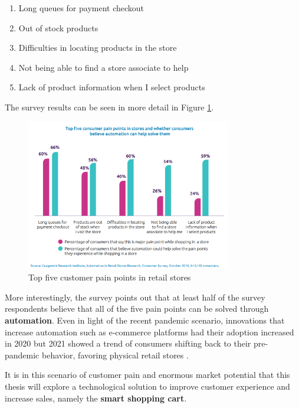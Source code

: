 \documentclass[openright]{normas-utf-tex} %
\begin{document}
\begin{enumerate}
        \item Long queues for payment checkout
        \item Out of stock products
        \item Difficulties in locating products in the store
        \item Not being able to find a store associate to help
        \item Lack of product information when I select products
\end{enumerate}

The survey results can be seen in more detail in Figure \ref{fig:capgemini}.

\begin{figure}[H]
	\centering
	\includegraphics[width=0.8\textwidth]{./images/painpoints.png}
    \caption[Top five customer pain points in retail stores]{Top five customer pain points in retail stores}
    \label{fig:capgemini}
\end{figure}

More interestingly, the survey points out that at least half of the survey
respondents believe that all of the five pain points can be solved through
\textbf{automation}. Even in light of the recent pandemic scenario, innovations
that increase automation such as e-commerce platforms had their adoption
increased in 2020 but 2021 showed a trend of consumers shifting
back to their pre-pandemic behavior, favoring physical retail stores
\cite{Kantar2022}.

It is in this scenario of customer pain and enormous market potential that this
thesis will explore a technological solution to improve customer experience and increase sales,
namely the \textbf{smart shopping cart}.
\end{document}
